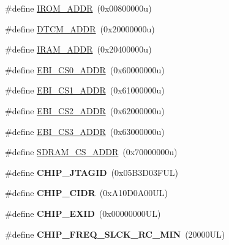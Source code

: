 \begin{DoxyCompactItemize}
\item 
\#define \mbox{\hyperlink{group__SAME70J19__definitions_ga694212ffb8c2786bacee3d0ad6020bda}{I\+R\+O\+M\+\_\+\+A\+D\+DR}}~(0x00800000u)
\item 
\#define \mbox{\hyperlink{group__SAME70J19__definitions_ga26626a425f7ebb3a0c2dbc276f0d9f78}{D\+T\+C\+M\+\_\+\+A\+D\+DR}}~(0x20000000u)
\item 
\#define \mbox{\hyperlink{group__SAME70J19__definitions_gaae45ac2ef16942159481c767ac4805cf}{I\+R\+A\+M\+\_\+\+A\+D\+DR}}~(0x20400000u)
\item 
\#define \mbox{\hyperlink{group__SAME70J19__definitions_ga9bcbb97ddae3b2cc5e2c9613d33f66b4}{E\+B\+I\+\_\+\+C\+S0\+\_\+\+A\+D\+DR}}~(0x60000000u)
\item 
\#define \mbox{\hyperlink{group__SAME70J19__definitions_gaaddd9fdbbc77c9aced5308819f502a26}{E\+B\+I\+\_\+\+C\+S1\+\_\+\+A\+D\+DR}}~(0x61000000u)
\item 
\#define \mbox{\hyperlink{group__SAME70J19__definitions_ga058a35f9991487dc2dd12ada792d0730}{E\+B\+I\+\_\+\+C\+S2\+\_\+\+A\+D\+DR}}~(0x62000000u)
\item 
\#define \mbox{\hyperlink{group__SAME70J19__definitions_gad66ebdd0fc33ec3cf85dbaa14bbf05d9}{E\+B\+I\+\_\+\+C\+S3\+\_\+\+A\+D\+DR}}~(0x63000000u)
\item 
\#define \mbox{\hyperlink{group__SAME70J19__definitions_ga61b7db25daf759c2a2beb6e5a0b57a84}{S\+D\+R\+A\+M\+\_\+\+C\+S\+\_\+\+A\+D\+DR}}~(0x70000000u)
\item 
\mbox{\label{group__SAME70J19__definitions_gaa614519778eec0df55d3eeab3223e3f6}} 
\#define {\bfseries C\+H\+I\+P\+\_\+\+J\+T\+A\+G\+ID}~(0x05\+B3\+D03\+F\+U\+L)
\item 
\mbox{\label{group__SAME70J19__definitions_ga1e1ae44dd9269a8a98c1d7e7a60e9fbd}} 
\#define {\bfseries C\+H\+I\+P\+\_\+\+C\+I\+DR}~(0x\+A10\+D0\+A00\+U\+L)
\item 
\mbox{\label{group__SAME70J19__definitions_ga35123717aa86b76bb6b73cf3adc4c2e6}} 
\#define {\bfseries C\+H\+I\+P\+\_\+\+E\+X\+ID}~(0x00000000\+U\+L)
\item 
\mbox{\label{group__SAME70J19__definitions_ga0e868bf27426399dfdcb3a9dfc3733c4}} 
\#define {\bfseries C\+H\+I\+P\+\_\+\+F\+R\+E\+Q\+\_\+\+S\+L\+C\+K\+\_\+\+R\+C\+\_\+\+M\+IN}~(20000\+U\+L)

\end{DoxyCompactItemize}
